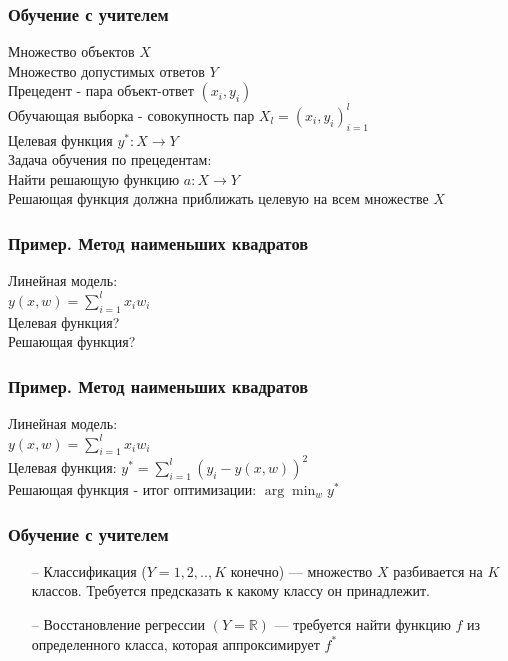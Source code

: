 \documentclass[12pt]{beamer}
\begin{document}
\begin{frame}\frametitle{Обучение с учителем }
Множество объектов $X$ \\
Множество допустимых ответов $Y$\\
Прецедент - пара объект-ответ ${(x_i,y_i)}$  \\
Обучающая выборка - совокупность пар ${X_l = (x_i,y_i)_{i=1}^l}$ \\
Целевая функция ${y^*:X \rightarrow Y}$\\
\vspace{5mm}
Задача обучения по прецедентам:\\
Найти решающую функцию ${a: X \rightarrow Y}$  \\
Решающая функция должна приближать целевую на всем множестве ${X}$
\end{frame}

\begin{frame}\frametitle{Пример. Метод наименьших квадратов}
Линейная модель:\\
${y(x, w) = \sum\limits_{i=1}^l x_i w_i }$ \\
\vspace{5mm}
Целевая функция?\\
\vspace{5mm}
Решающая функция?
\end{frame}

\begin{frame}\frametitle{Пример. Метод наименьших квадратов}
Линейная модель:\\
${y(x, w) = \sum\limits_{i=1}^l x_i w_i }$ \\
Целевая функция:
${y^* = \sum\limits_{i=1}^l (y_i - y(x, w))^2}$ \\
\vspace{5mm}
Решающая функция - итог оптимизации:
${\arg\min_w y^*}$
\end{frame}

\begin{frame}\frametitle{Обучение с учителем }
\begin{itemize}
  \item[--] Классификация (${Y={1,2,..,K}}$ конечно) — множество $X$ разбивается на $K$ классов. Требуется предсказать к какому классу он принадлежит. 
  \item[--] Восстановление регрессии ${(Y=\mathbb{R})}$ — требуется найти функцию $f$ из определенного класса, которая аппроксимирует $f^*$
\end{itemize}
\end{frame}
\end{document}
